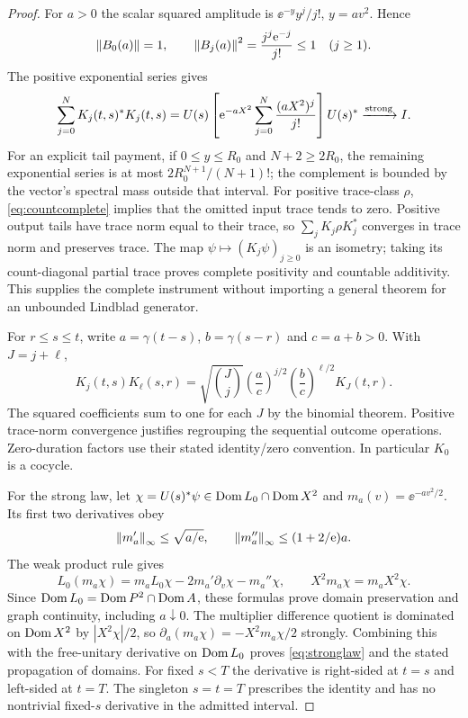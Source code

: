 \begin{proof}
For $a>0$ the scalar squared amplitude is
$\ee^{-y}y^j/j!$, $y=av^2$. Hence
\[
 \left\lVert B_0(a)\right\rVert=1,\qquad
 \left\lVert B_j(a)\right\rVert^2=\frac{j^j\mathrm e^{-j}}{j!}\le1\quad(j\ge1).
\]
The positive exponential series gives
\begin{equation}\label{eq:countcomplete}
 \sum_{j=0}^NK_j(t,s)^*K_j(t,s)
 =U(s)\left[\mathrm e^{-aX^2}\sum_{j=0}^N\frac{(aX^2)^j}{j!}\right]U(s)^*
 \xrightarrow{\rm strong}I.
\end{equation}
For an explicit tail payment, if $0\le y\le R_0$ and
$N+2\ge2R_0$, the remaining exponential series is at most
$2R_0^{N+1}/(N+1)!$; the complement is bounded by the vector's spectral
mass outside that interval. For positive trace-class $\rho$,
\eqref{eq:countcomplete} implies that the omitted input trace tends
to zero. Positive output tails have trace norm equal to their trace,
so $\sum_jK_j\rho K_j^*$ converges in trace norm and preserves trace.
The map $\psi\mapsto(K_j\psi)_{j\ge0}$ is an isometry; taking its
count-diagonal partial trace proves complete positivity and countable
additivity. This supplies the complete instrument without importing a
general theorem for an unbounded Lindblad generator.

For $r\le s\le t$, write $a=\gamma(t-s)$, $b=\gamma(s-r)$ and
$c=a+b>0$. With $J=j+\ell$,
\begin{equation}\label{eq:countcompose}
 K_j(t,s)K_\ell(s,r)
 =\sqrt{\binom Jj}\left(\frac ac\right)^{j/2}
                    \left(\frac bc\right)^{\ell/2}K_J(t,r).
\end{equation}
The squared coefficients sum to one for each $J$ by the binomial
theorem. Positive trace-norm convergence justifies regrouping the
sequential outcome operations. Zero-duration factors use their stated
identity/zero convention. In particular $K_0$ is a cocycle.

For the strong law, let $\chi=U(s)^*\psi\in\operatorname{Dom} L_0\cap\operatorname{Dom} X^2$
and $m_a(v)=\ee^{-av^2/2}$. Its first two derivatives obey
\[
 \left\lVert m_a'\right\rVert_\infty\le\sqrt{a/\mathrm e},\qquad
 \left\lVert m_a''\right\rVert_\infty\le(1+2/\mathrm e)a.
\]
The weak product rule gives
\begin{equation}\label{eq:graphproduct}
 L_0(m_a\chi)=m_aL_0\chi-2m_a'\partial_v\chi-m_a''\chi,
 \qquad X^2m_a\chi=m_aX^2\chi.
\end{equation}
Since $\operatorname{Dom} L_0=\operatorname{Dom} P^2\cap\operatorname{Dom} A$, these formulas prove domain
preservation and graph continuity, including $a\downarrow0$.
The multiplier difference quotient is dominated on $\operatorname{Dom} X^2$ by
$|X^2\chi|/2$, so
$\partial_a(m_a\chi)=-X^2m_a\chi/2$ strongly.
Combining this with the free-unitary derivative on $\operatorname{Dom} L_0$ proves
\eqref{eq:stronglaw} and the stated propagation of domains. For fixed
$s<T$ the derivative is right-sided at $t=s$ and left-sided at $t=T$.
The singleton $s=t=T$ prescribes the identity and has no nontrivial
fixed-$s$ derivative in the admitted interval.


\end{proof}
